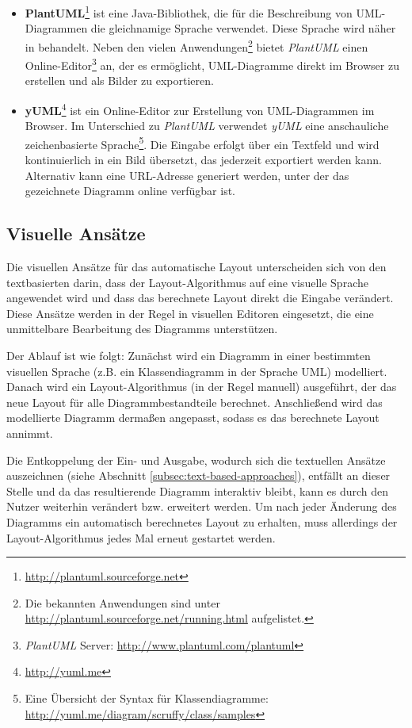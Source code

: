\begin{itemize}
    \item \textbf{PlantUML}\footnote{\url{http://plantuml.sourceforge.net}} ist eine Java-Bibliothek, die für die Beschreibung von UML-\-Dia\-grammen die gleichnamige Sprache verwendet. Diese Sprache wird näher in \cite{Roques10Drawing} behandelt. Neben den vielen Anwendungen\footnote{Die bekannten Anwendungen sind unter \url{http://plantuml.sourceforge.net/running.html} aufgelistet.} bietet \textit{PlantUML} einen Online-Editor\footnote{\textit{PlantUML} Server: \url{http://www.plantuml.com/plantuml}} an, der es ermöglicht, UML-Diagramme direkt im Browser zu erstellen und als Bilder zu exportieren.
    \item \textbf{yUML}\footnote{\url{http://yuml.me}} ist ein Online-Editor zur Erstellung von UML-Diagrammen im Browser. Im Unterschied zu \textit{PlantUML} verwendet \textit{yUML} eine anschauliche zeichenbasierte Sprache\footnote{Eine Übersicht der Syntax für Klassendiagramme: \url{http://yuml.me/diagram/scruffy/class/samples}}. Die Eingabe erfolgt über ein Textfeld und wird kontinuierlich in ein Bild übersetzt, das jederzeit exportiert werden kann. Alternativ kann eine URL-Adresse generiert \cite{Fuhrmann11On-the-Pragmatics} werden, unter der das gezeichnete Diagramm online verfügbar ist.
\end{itemize}

\subsection{Visuelle Ansätze}
\label{subsec:visual-approaches}

Die visuellen Ansätze für das automatische Layout unterscheiden sich von den textbasierten darin, dass der Layout-Algorithmus auf eine visuelle Sprache angewendet wird und dass das berechnete Layout direkt die Eingabe verändert. Diese Ansätze werden in der Regel in visuellen Editoren eingesetzt, die eine unmittelbare Bearbeitung des Diagramms unterstützen.

Der Ablauf ist wie folgt: Zunächst wird ein Diagramm in einer bestimmten visuellen Sprache (z.B. ein Klassendiagramm in der Sprache UML) modelliert. Danach wird ein Layout-Algorithmus (in der Regel manuell) ausgeführt, der das neue Layout für alle Diagrammbestandteile berechnet. Anschließend wird das modellierte Diagramm dermaßen angepasst, sodass es das berechnete Layout annimmt.

Die Entkoppelung der Ein- und Ausgabe, wodurch sich die textuellen Ansätze auszeichnen (siehe Abschnitt \ref{subsec:text-based-approaches}), entfällt an dieser Stelle und da das resultierende Diagramm interaktiv bleibt, kann es durch den Nutzer weiterhin verändert bzw. erweitert werden. Um nach jeder Änderung des Diagramms ein automatisch berechnetes Layout zu erhalten, muss allerdings der Layout-Algorithmus jedes Mal erneut gestartet werden.


